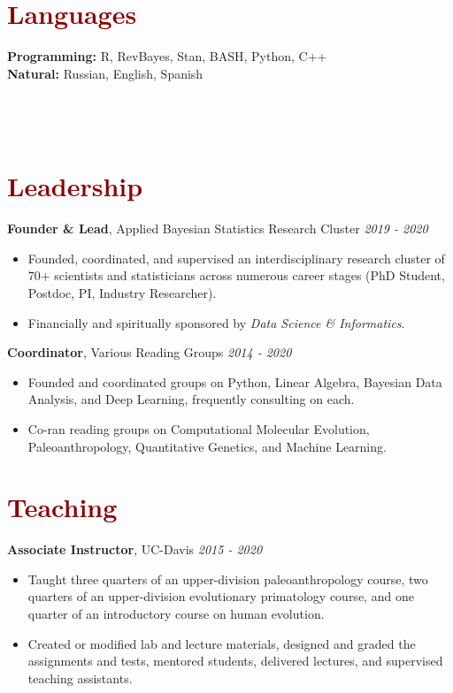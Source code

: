 \documentclass[11pt,margin,line]{resume}
\begin{document}
\begin{resume}
\section{\large\textcolor{DarkRed}{Languages}}

\textbf{Programming:} R, RevBayes, Stan, BASH, Python, C++\\
\textbf{Natural:} Russian, English, Spanish\\\\\\\\


\section{\large\textcolor{DarkRed}{Leadership}}

\textbf{Founder \& Lead}, Applied Bayesian Statistics Research Cluster \hfill \emph{2019 - 2020}
\begin{itemize}[noitemsep]
\item Founded, coordinated, and supervised an interdisciplinary research cluster of 70+ scientists and statisticians across numerous career stages (PhD Student, Postdoc, PI, Industry Researcher). \item Financially and spiritually sponsored by \emph{Data Science \& Informatics}.
\end{itemize} 
\vspace{-1.5mm}

\textbf{Coordinator}, Various Reading Groups \hfill \emph{2014 - 2020}
\begin{itemize}[noitemsep]
\item Founded and coordinated groups on Python, Linear Algebra, Bayesian Data Analysis, and Deep Learning, frequently consulting on each. 
\item Co-ran reading groups on Computational Molecular Evolution, Paleoanthropology, Quantitative Genetics, and Machine Learning.
\end{itemize} 
\vspace{-1.5mm}

\section{\large\textcolor{DarkRed}{Teaching}}

\textbf{Associate Instructor}, UC-Davis \hfill \emph{2015  - 2020}
\begin{itemize}[noitemsep]
\item Taught three quarters of an upper-division paleoanthropology course, two quarters of an upper-division evolutionary primatology course, and one quarter of an introductory course on human evolution. 
\item Created or modified lab and lecture materials, designed and graded the assignments and tests, mentored students, delivered lectures, and supervised teaching assistants.
\end{itemize} 
\vspace{-1.5mm}


\end{resume}
\end{document}
